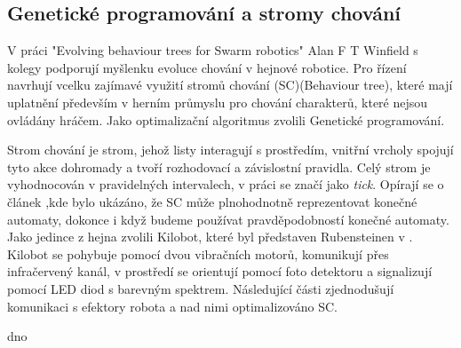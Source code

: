 \subsection{Genetické programování a stromy chování}
V práci "Evolving behaviour trees for Swarm robotics" \cite{jonesevolving} Alan F T Winfield s kolegy podporují myšlenku evoluce chování v hejnové robotice. Pro řízení navrhují vcelku zajímavé využití stromů chování (SC)(Behaviour tree), které mají uplatnění především v herním průmyslu pro chování charakterů, které nejsou ovládány hráčem. Jako optimalizační algoritmus zvolili Genetické programování. 
\par
Strom chování je strom, jehož listy interagují s prostředím, vnitřní vrcholy spojují tyto akce dohromady a tvoří rozhodovací a závislostní pravidla. Celý strom je vyhodnocován v pravidelných intervalech, v práci se značí jako \textit{tick}. Opírají se o článek \cite{shoulson2011parameterizing},kde bylo ukázáno, že SC může plnohodnotně reprezentovat konečné automaty, dokonce i když budeme používat pravděpodobností konečné automaty. Jako jedince z hejna zvolili Kilobot, které byl představen Rubensteinen v \cite{Kilobots}. Kilobot se pohybuje pomocí dvou vibračních motorů, komunikují přes infračervený kanál, v prostředí se orientují pomocí foto detektoru a signalizují pomocí LED diod s barevným spektrem. Následující části zjednodušují komunikaci s efektory robota a nad nimi optimalizováno SC. 
\par
\begin{table}[h]dno
	\caption{Parameterizing behavior trees, Motion in Games - podoba stromů}
\end{table}
